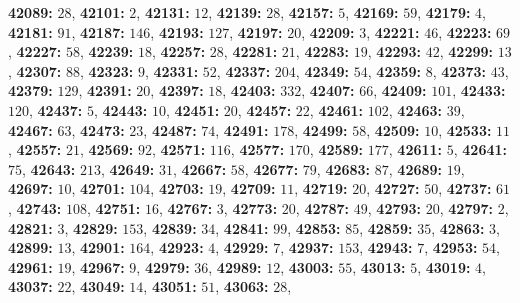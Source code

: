 \textsf{\bfseries 42089:} $28$, \textsf{\bfseries 42101:} $2$, \textsf{\bfseries 42131:} $12$, \textsf{\bfseries 42139:} $28$, \textsf{\bfseries 42157:} $5$, \textsf{\bfseries 42169:} $59$, \textsf{\bfseries 42179:} $4$, \textsf{\bfseries 42181:} $91$, \textsf{\bfseries 42187:} $146$, \textsf{\bfseries 42193:} $127$, \textsf{\bfseries 42197:} $20$, \textsf{\bfseries 42209:} $3$, \textsf{\bfseries 42221:} $46$, \textsf{\bfseries 42223:} $69$, \textsf{\bfseries 42227:} $58$, \textsf{\bfseries 42239:} $18$, \textsf{\bfseries 42257:} $28$, \textsf{\bfseries 42281:} $21$, \textsf{\bfseries 42283:} $19$, \textsf{\bfseries 42293:} $42$, \textsf{\bfseries 42299:} $13$, \textsf{\bfseries 42307:} $88$, \textsf{\bfseries 42323:} $9$, \textsf{\bfseries 42331:} $52$, \textsf{\bfseries 42337:} $204$, \textsf{\bfseries 42349:} $54$, \textsf{\bfseries 42359:} $8$, \textsf{\bfseries 42373:} $43$, \textsf{\bfseries 42379:} $129$, \textsf{\bfseries 42391:} $20$, \textsf{\bfseries 42397:} $18$, \textsf{\bfseries 42403:} $332$, \textsf{\bfseries 42407:} $66$, \textsf{\bfseries 42409:} $101$, \textsf{\bfseries 42433:} $120$, \textsf{\bfseries 42437:} $5$, \textsf{\bfseries 42443:} $10$, \textsf{\bfseries 42451:} $20$, \textsf{\bfseries 42457:} $22$, \textsf{\bfseries 42461:} $102$, \textsf{\bfseries 42463:} $39$, \textsf{\bfseries 42467:} $63$, \textsf{\bfseries 42473:} $23$, \textsf{\bfseries 42487:} $74$, \textsf{\bfseries 42491:} $178$, \textsf{\bfseries 42499:} $58$, \textsf{\bfseries 42509:} $10$, \textsf{\bfseries 42533:} $11$, \textsf{\bfseries 42557:} $21$, \textsf{\bfseries 42569:} $92$, \textsf{\bfseries 42571:} $116$, \textsf{\bfseries 42577:} $170$, \textsf{\bfseries 42589:} $177$, \textsf{\bfseries 42611:} $5$, \textsf{\bfseries 42641:} $75$, \textsf{\bfseries 42643:} $213$, \textsf{\bfseries 42649:} $31$, \textsf{\bfseries 42667:} $58$, \textsf{\bfseries 42677:} $79$, \textsf{\bfseries 42683:} $87$, \textsf{\bfseries 42689:} $19$, \textsf{\bfseries 42697:} $10$, \textsf{\bfseries 42701:} $104$, \textsf{\bfseries 42703:} $19$, \textsf{\bfseries 42709:} $11$, \textsf{\bfseries 42719:} $20$, \textsf{\bfseries 42727:} $50$, \textsf{\bfseries 42737:} $61$, \textsf{\bfseries 42743:} $108$, \textsf{\bfseries 42751:} $16$, \textsf{\bfseries 42767:} $3$, \textsf{\bfseries 42773:} $20$, \textsf{\bfseries 42787:} $49$, \textsf{\bfseries 42793:} $20$, \textsf{\bfseries 42797:} $2$, \textsf{\bfseries 42821:} $3$, \textsf{\bfseries 42829:} $153$, \textsf{\bfseries 42839:} $34$, \textsf{\bfseries 42841:} $99$, \textsf{\bfseries 42853:} $85$, \textsf{\bfseries 42859:} $35$, \textsf{\bfseries 42863:} $3$, \textsf{\bfseries 42899:} $13$, \textsf{\bfseries 42901:} $164$, \textsf{\bfseries 42923:} $4$, \textsf{\bfseries 42929:} $7$, \textsf{\bfseries 42937:} $153$, \textsf{\bfseries 42943:} $7$, \textsf{\bfseries 42953:} $54$, \textsf{\bfseries 42961:} $19$, \textsf{\bfseries 42967:} $9$, \textsf{\bfseries 42979:} $36$, \textsf{\bfseries 42989:} $12$, \textsf{\bfseries 43003:} $55$, \textsf{\bfseries 43013:} $5$, \textsf{\bfseries 43019:} $4$, \textsf{\bfseries 43037:} $22$, \textsf{\bfseries 43049:} $14$, \textsf{\bfseries 43051:} $51$, \textsf{\bfseries 43063:} $28$, 
